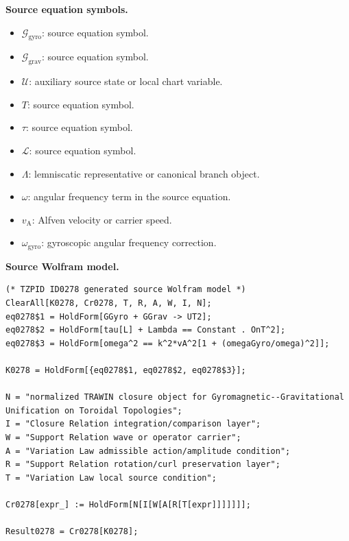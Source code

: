 \begin{minipage}[t]{0.49\linewidth}
\begingroup
\small
\raggedright
\textbf{Source equation symbols.}\par
\begin{itemize}[leftmargin=1.35em,itemsep=1pt,topsep=1pt,parsep=0pt]
    \item $\mathcal{G}_{\mathrm{gyro}}$: source equation symbol.
    \item $\mathcal{G}_{\mathrm{grav}}$: source equation symbol.
    \item $\mathcal{U}$: auxiliary source state or local chart variable.
    \item $T$: source equation symbol.
    \item $\tau$: source equation symbol.
    \item $\mathcal{L}$: source equation symbol.
    \item $\Lambda$: lemniscatic representative or canonical branch object.
    \item $\omega$: angular frequency term in the source equation.
    \item $v_{\mathrm{A}}$: Alfven velocity or carrier speed.
    \item $\omega_{\mathrm{gyro}}$: gyroscopic angular frequency correction.
\end{itemize}
\endgroup
\end{minipage}\hfill
\begin{minipage}[t]{0.47\linewidth}
\begingroup
\scriptsize
\raggedright
\textbf{Source Wolfram model.}\par
\begin{Verbatim}[fontsize=\tiny,breaklines=true,breakanywhere=true]
(* TZPID ID0278 generated source Wolfram model *)
ClearAll[K0278, Cr0278, T, R, A, W, I, N];
eq0278$1 = HoldForm[GGyro + GGrav -> UT2];
eq0278$2 = HoldForm[tau[L] + Lambda == Constant . OnT^2];
eq0278$3 = HoldForm[omega^2 == k^2*vA^2[1 + (omegaGyro/omega)^2]];

K0278 = HoldForm[{eq0278$1, eq0278$2, eq0278$3}];

N = "normalized TRAWIN closure object for Gyromagnetic--Gravitational Unification on Toroidal Topologies";
I = "Closure Relation integration/comparison layer";
W = "Support Relation wave or operator carrier";
A = "Variation Law admissible action/amplitude condition";
R = "Support Relation rotation/curl preservation layer";
T = "Variation Law local source condition";

Cr0278[expr_] := HoldForm[N[I[W[A[R[T[expr]]]]]]];

Result0278 = Cr0278[K0278];
\end{Verbatim}
\endgroup
\end{minipage}

